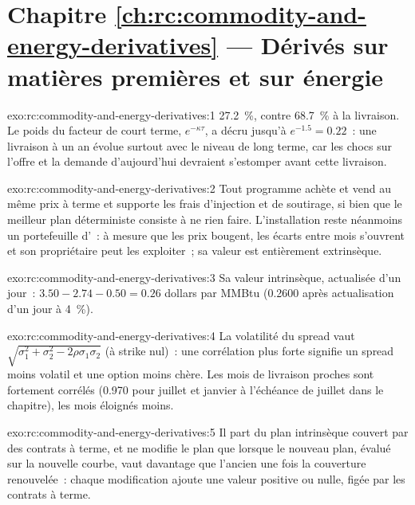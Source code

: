 \section*{Chapitre \ref{ch:rc:commodity-and-energy-derivatives} --- Dérivés sur matières premières et sur énergie}

\begin{solution}{exo:rc:commodity-and-energy-derivatives:1}
27.2~\%, contre 68.7~\% à la livraison. Le poids du facteur de court terme, $e^{-\kappa\tau}$, a
décru jusqu'à $e^{-1.5} = 0.22$~: une livraison à un an évolue surtout avec le niveau de long terme,
car les chocs sur l'offre et la demande d'aujourd'hui devraient s'estomper avant cette livraison.
\end{solution}

\begin{solution}{exo:rc:commodity-and-energy-derivatives:2}
Tout programme achète et vend au même prix à terme et supporte les frais d'injection et
de soutirage, si bien que le meilleur plan déterministe consiste à ne rien faire. L'installation
reste néanmoins un portefeuille d'~: à mesure que les prix bougent, les écarts entre mois
s'ouvrent et son propriétaire peut les exploiter~; sa valeur est entièrement extrinsèque.
\end{solution}

\begin{solution}{exo:rc:commodity-and-energy-derivatives:3}
Sa valeur intrinsèque, actualisée d'un jour~: $3.50-2.74-0.50 = 0.26$ dollars par MMBtu
(0.2600 après actualisation d'un jour à 4~\%).
\end{solution}

\begin{solution}{exo:rc:commodity-and-energy-derivatives:4}
La volatilité du spread vaut $\sqrt{\sigma_1^2+\sigma_2^2-2\rho\sigma_1\sigma_2}$ (à strike nul)~: une corrélation plus forte
signifie un spread moins volatil et une option moins chère. Les mois de livraison proches sont fortement
corrélés (0.970 pour juillet et janvier à l'échéance de juillet dans le chapitre), les mois éloignés moins.
\end{solution}

\begin{solution}{exo:rc:commodity-and-energy-derivatives:5}
Il part du plan intrinsèque couvert par des contrats à terme, et ne modifie le plan que lorsque le
nouveau plan, évalué sur la nouvelle courbe, vaut davantage que l'ancien une fois la couverture
renouvelée~: chaque modification ajoute une valeur positive ou nulle, figée par les contrats à terme.
\end{solution}

